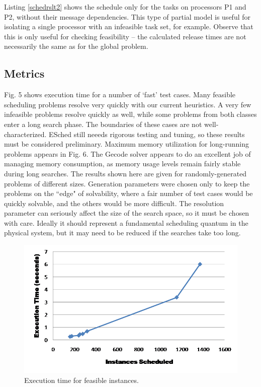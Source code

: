 Listing \ref{schedrslt2} shows the schedule only for the tasks on processors P1 and P2, without their message dependencies.  This type of partial model is useful for isolating a single processor with an infeasible task set, for example.  Observe that this is only useful for checking feasibility -- the calculated release times are not necessarily the same as for the global problem.

\subsection{Metrics}

Fig. 5 shows execution time for a number of `fast' test cases.  Many feasible scheduling problems resolve very quickly with our current heuristics.  A very few infeasible problems resolve quickly as well, while some problems from both classes enter a long search phase.  The boundaries of these cases are not well-characterized.  ESched still neeeds rigorous testing and tuning, so these results must be considered preliminary. Maximum memory utilization for long-running problems appears in Fig. 6.  The Gecode solver appears to do an excellent job of managing memory consumption, as memory usage levels remain fairly stable during long searches.  The results shown here are given for randomly-generated problems of different sizes.  Generation parameters were chosen only to keep the problems on the ``edge" of solvability, where a fair number of test cases would be quickly solvable, and the others would be more difficult.  The resolution parameter can seriously affect the size of the search space, so it must be chosen with care.  Ideally it should represent a fundamental scheduling quantum in the physical system, but it may need to be reduced if the searches take too long.

\begin{figure}[ht]
	  \label{fig:exectime}
		\includegraphics[scale=.7]{figures/exectime.png}
		\centering
		\caption{Execution time for feasible instances.}
\end{figure}

